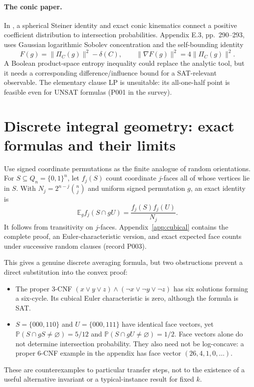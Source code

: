 \documentclass[11pt,a4paper]{article}
\begin{document}
\paragraph{The conic paper.}
In \citet[Fact 5.7, Theorems 6.1 and 7.1]{almt2014}, a spherical Steiner
identity and exact conic kinematics connect a positive coefficient
distribution to intersection probabilities. Appendix E.3, pp.~290--293,
uses Gaussian logarithmic Sobolev concentration and the self-bounding identity
\[
 F(g)=\|\Pi_C(g)\|^2-\delta(C),\qquad
 \|\nabla F(g)\|^2=4\|\Pi_C(g)\|^2.
\]
A Boolean product-space entropy inequality could replace the analytic tool,
but it needs a corresponding difference/influence bound for a SAT-relevant
observable. The elementary clause LP is unsuitable: its all-one-half point
is feasible even for UNSAT formulas (P001 in the survey).

\section{Discrete integral geometry: exact formulas and their limits}
Use signed coordinate permutations as the finite analogue of random
orientations. For $S\subseteq Q_n=\{0,1\}^n$, let $f_j(S)$ count coordinate
$j$-faces all of whose vertices lie in $S$. With
$N_j=2^{n-j}\binom nj$ and uniform signed permutation $g$, an exact identity is
\begin{equation}
 \mathbb E_g f_j(S\cap gU)=\frac{f_j(S)f_j(U)}{N_j}.
 \label{eq:memo-kinematic}
\end{equation}
It follows from transitivity on $j$-faces. Appendix~\ref{app:cubical}
contains the complete proof, an Euler-characteristic version, and exact
expected face counts under successive random clauses (record P003).

This gives a genuine discrete averaging formula, but two obstructions
prevent a direct substitution into the convex proof:
\begin{itemize}
 \item The proper 3-CNF $(x\lor y\lor z)\land(\neg x\lor\neg y\lor\neg z)$
 has six solutions forming a six-cycle. Its cubical Euler characteristic is
 zero, although the formula is SAT.
 \item $S=\{000,110\}$ and $U=\{000,111\}$ have identical face vectors,
 yet $\mathbb P(S\cap gS\ne\varnothing)=5/12$ and
 $\mathbb P(S\cap gU\ne\varnothing)=1/2$. Face vectors alone do not determine
 intersection probability. They also need not be log-concave: a proper
 6-CNF example in the appendix has face vector $(26,4,1,0,\ldots)$.
\end{itemize}
These are counterexamples to particular transfer steps, not to the existence
of a useful alternative invariant or a typical-instance result for fixed $k$.
\end{document}
